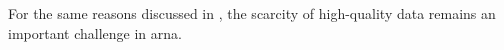 

For the same reasons discussed in
, the scarcity of high-quality
data remains an important challenge in \gls{arna}.
